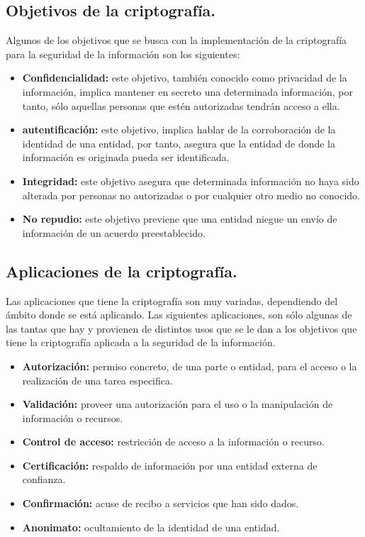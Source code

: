 \documentclass[12pt, a4paper, titlepage]{report}
\begin{document}
            \subsection{Objetivos de la criptografía.}
                Algunos de los objetivos que se busca con la implementación de la criptografía para la seguridad de la información son los siguientes:
                \begin{itemize}
                    \item \textbf{Confidencialidad:} este objetivo, también conocido como privacidad de la información, implica mantener en secreto una determinada información, por tanto, sólo aquellas personas que estén autorizadas tendrán acceso a ella.
                    \item \textbf{autentificación:} este objetivo, implica hablar de la corroboración de la identidad de una entidad, por tanto, asegura que la entidad de donde la información es originada pueda ser identificada.
                    \item \textbf{Integridad:} este objetivo asegura que determinada información no haya sido alterada por personas no autorizadas o por cualquier otro medio no conocido.
                    \item \textbf{No repudio:} este objetivo previene que una entidad niegue un envío de información de un acuerdo preestablecido.
                \end{itemize}
            \subsection{Aplicaciones de la criptografía.}
                Las aplicaciones que tiene la criptografía son muy variadas, dependiendo del ámbito donde se está aplicando. Las siguientes aplicaciones, son sólo algunas de las tantas que hay y provienen de distintos usos que se le dan a los objetivos que tiene la criptografía aplicada a la seguridad de la información. \cite{refCriptografia}
                \begin{itemize}
                    \item \textbf{Autorización:} permiso concreto, de una parte o entidad, para el acceso o la realización de una tarea especifica.
                    \item \textbf{Validación:} proveer una autorización para el uso o la manipulación de información o recursos.
                    \item \textbf{Control de acceso:} restricción de acceso a la información o recurso.
                    \item \textbf{Certificación:} respaldo de información por una entidad externa de confianza.
                    \item \textbf{Confirmación:} acuse de recibo a servicios que han sido dados.
                    \item \textbf{Anonimato:} ocultamiento de la identidad de una entidad.
                \end{itemize}
                
\end{document}
